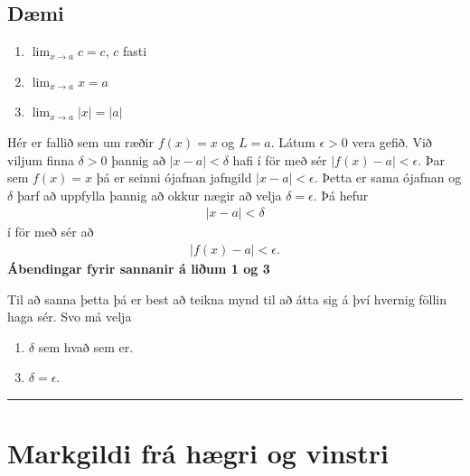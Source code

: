 \documentclass[a4paper,10pt,icelandic]{sphinxmanual}
\begin{document}
\subsection{Dæmi}
\label{kafli02:daemi}\label{kafli02:daemi2-1}\begin{enumerate}
\item {} 
\(\lim_{x \to a} c = c\), \(c\) fasti

\item {} 
\(\lim_{x \to a} x = a\)

\item {} 
\(\lim_{x \to a} |x| = |a|\)

\end{enumerate}

Hér er fallið sem um ræðir \(f(x) = x\) og \(L=a\).
Látum \(\epsilon>0\) vera gefið. Við viljum finna
\(\delta >0\) þannig að \(|x-a|<\delta\) hafi í för
með sér \(|f(x)-a| < \epsilon\). Þar sem \(f(x)=x\) þá er seinni
ójafnan jafngild \(|x-a|<\epsilon\). Þetta er sama ójafnan og
\(\delta\) þarf að uppfylla þannig að okkur nægir að velja
\(\delta = \epsilon\). Þá hefur
\begin{equation*}
\begin{split}|x-a| < \delta\end{split}
\end{equation*}
í för með sér að
\begin{equation*}
\begin{split}|f(x) -a| < \epsilon.\end{split}
\end{equation*}
\textbf{Ábendingar fyrir sannanir á liðum 1 og 3}

Til að sanna þetta þá er best að teikna mynd til að átta sig á því hvernig
föllin haga sér. Svo má velja
\begin{enumerate}
\item {} 
\(\delta\) sem hvað sem er.

\end{enumerate}
\begin{enumerate}
\setcounter{enumi}{2}
\item {} 
\(\delta=\epsilon\).

\end{enumerate}


\bigskip\hrule{}\bigskip



\section{Markgildi frá hægri og vinstri}
\label{kafli02:markgildi-fra-haegri-og-vinstri}
\end{document}
